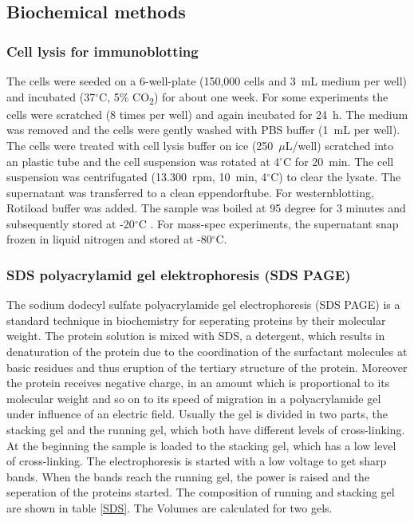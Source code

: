 \documentclass[a4paper,11pt,bibtotocnumbered]{article}
\begin{document}
\newpage

\subsection{Biochemical methods}


\subsubsection{Cell lysis for immunoblotting}

The cells were seeded on a 6-well-plate (150,000 cells and 3~mL medium per well) and incubated (37$^\circ$C, 5\% CO\textsubscript{2}) for about one week. For some experiments the cells were scratched (8 times per well) and again incubated for 24~h. The medium was removed and the cells were gently washed with PBS buffer (1~mL per well). The cells were treated with cell lysis buffer on ice (250~$\mu$L/well) scratched into an plastic tube and the cell suspension was rotated at 4$^\circ$C for 20~min. The cell suspension was centrifugated (13.300~rpm, 10~min, 4$^\circ$C) to clear the lysate. The supernatant was transferred to a clean eppendorftube. For westernblotting, Rotiload buffer was added. The sample was boiled at 95 degree for 3 minutes and subsequently stored at -20$^\circ$C . For mass-spec experiments, the supernatant snap frozen in liquid nitrogen and stored at -80$^\circ$C.




\subsubsection{SDS polyacrylamid gel elektrophoresis (SDS PAGE)}


The sodium dodecyl sulfate polyacrylamide gel electrophoresis (SDS PAGE) is a standard technique in biochemistry for seperating proteins by their molecular weight. The protein solution is mixed with SDS, a detergent, which results in denaturation of the protein due to the coordination of the surfactant molecules at basic residues and thus eruption of the tertiary structure of the protein. Moreover the protein receives negative charge, in an amount which is proportional to its molecular weight and so on to its speed of migration in a polyacrylamide gel under influence of an electric field.  
Usually the gel is divided in two parts, the stacking gel and the running gel, which both have different levels of cross-linking. At the beginning the sample is loaded to the stacking gel, which has a low level of cross-linking. The electrophoresis is started with a low voltage to get sharp bands. When the bands reach the running gel, the power is raised and the seperation of the proteins started.
The composition of running and stacking gel are shown in table \ref{SDS}. The Volumes are calculated for two gels.
  
\end{document}
